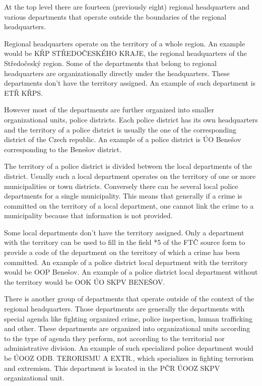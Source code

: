 At the top level there are fourteen (previously eight) regional headquarters and various departments that operate outside the boundaries of the regional headquarters.

Regional headquarters operate on the territory of a whole region.
An example would be KŘP STŘEDOČESKÉHO KRAJE, the regional headquarters of the Středočeský region.
Some of the departments that belong to regional headquarters are organizationally directly under the headquarters. These departments don't have the territory assigned.
An example of such department is ETŘ KŘPS.

However most of the departments are further organized into smaller organizational units, police districts.
Each police district has its own headquarters and the territory of a police district is usually the one of the corresponding district of the Czech republic.
An example of a police district is ÚO Benešov corresponding to the Benešov district.

The territory of a police district is divided between the local departments of the district. Usually such a local department operates on the territory of one or more municipalities or town districts.
Conversely there can be several local police departments for a single municipality.
This means that generally if a crime is committed on the territory of a local department, one cannot link the crime to a municipality because that information is not provided.

Some local departments don't have the territory assigned.
Only a department with the territory can be used to fill in the field *5 of the FTČ source form to provide a code of the department on the territory of which a crime has been committed.
An example of a police district local department with the territory would be OOP Benešov.
An example of a police district local department without the territory would be OOK ÚO SKPV BENEŠOV.

There is another group of departments that operate outside of the context of the regional headquarters.
Those departments are generally the departments with special agenda like fighting organized crime, police inspection, human trafficking and other.
These departments are organized into organizational units according to the type of agenda they perform, not according to the territorial nor administrative division.
An example of such specialized police department would be ÚOOZ ODB. TERORISMU A EXTR., which specializes in fighting terrorism and extremism. This department is located in the PČR ÚOOZ SKPV organizational unit.

